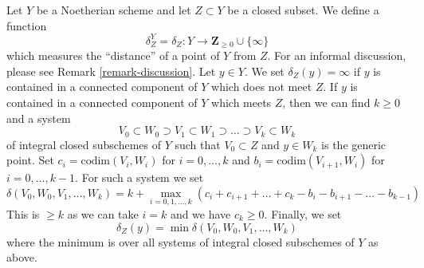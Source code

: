 \documentclass{stacks-project}
\theoremstyle{plain}
\theoremstyle{definition}
\theoremstyle{remark}
\numberwithin{equation}{subsection}
\begin{document}
\noindent
Let $Y$ be a Noetherian scheme and let $Z \subset Y$ be a closed subset.
We define a function
\begin{equation}
\label{equation-delta-Z}
\delta^Y_Z = \delta_Z : Y \longrightarrow \mathbf{Z}_{\geq 0} \cup \{\infty\}
\end{equation}
which measures the ``distance'' of a point of $Y$ from $Z$.
For an informal discussion, please see Remark \ref{remark-discussion}.
Let $y \in Y$. We set $\delta_Z(y) = \infty$ if $y$ is contained
in a connected component of $Y$ which does not meet $Z$.
If $y$ is contained in a connected component of $Y$ which meets $Z$,
then we can find $k \geq 0$ and a system
$$
V_0 \subset W_0 \supset V_1 \subset W_1 \supset \ldots \supset
V_k \subset W_k
$$
of integral closed subschemes of $Y$ such that $V_0 \subset Z$
and $y \in W_k$ is the generic point. Set
$c_i = \text{codim}(V_i, W_i)$ for $i = 0, \ldots, k$
and $b_i = \text{codim}(V_{i + 1}, W_i)$ for $i = 0, \ldots, k - 1$.
For such a system we set
$$
\delta(V_0, W_0, V_1, \ldots, W_k) =
k +
\max_{i = 0, 1, \ldots, k}
(c_i + c_{i + 1} + \ldots + c_k - b_i - b_{i + 1} - \ldots - b_{k - 1})
$$
This is $\geq k$ as we can take $i = k$ and we have $c_k \geq 0$.
Finally, we set
$$
\delta_Z(y) = \min \delta(V_0, W_0, V_1, \ldots, W_k)
$$
where the minimum is over all systems of integral closed subschemes of $Y$
as above.
\end{document}
